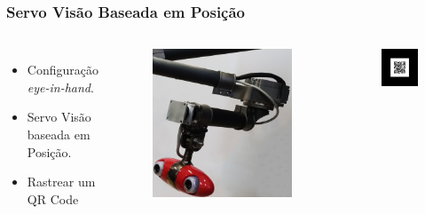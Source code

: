 \documentclass{beamer}
\begin{document}
\begin{frame}
\frametitle{Servo Visão Baseada em Posição}
\begin{columns}[c] %

\begin{itemize}
\item Configuração \textit{eye-in-hand}.
\item Servo Visão baseada em Posição.
\item Rastrear um QR Code
\end{itemize}

\begin{figure}
\includegraphics[width=0.5\linewidth]{./img/manip_zoom.png}
\end{figure}
\begin{figure}
\includegraphics[width=0.5\linewidth]{./img/template-qr-code-small.png}
\end{figure}
\end{columns}
\end{frame}
\end{document}

